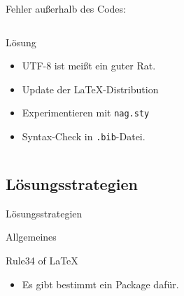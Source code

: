 \begin{frame}{Fehler außerhalb des Codes:}
\begin{columns}
    \begin{block}{Lösung}
      \begin{itemize}
      \item<4-> UTF-8 ist meißt ein guter Rat.
      \item<6-> Update der \LaTeX-Distribution
      \item<8-> Experimentieren mit \texttt{nag.sty}
      \item<10-> Syntax-Check in \texttt{.bib}-Datei. 
      \end{itemize}
      
    \end{block}
    
  \end{columns}
  
\end{frame}
\subsection{Lösungsstrategien}
\begin{frame}[c]
	\begin{center}
		\large Lösungsstrategien
	\end{center}
\end{frame}
\begin{frame}{Allgemeines}

    \begin{block}{Rule34 of \LaTeX}
      \begin{itemize}
      \item<3-> Es gibt bestimmt ein Package dafür. 
      \end{itemize}
    \end{block}


\end{frame}

